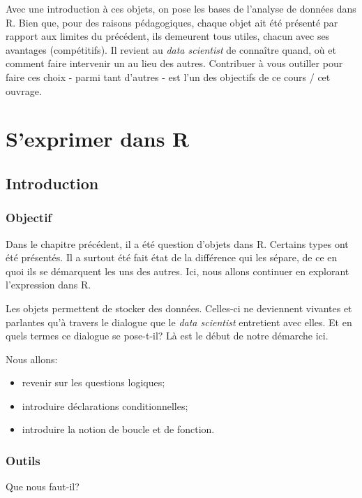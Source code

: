 \documentclass[]{book}
\begin{document}
Avec une introduction à ces objets, on pose les bases de l'analyse de
données dans R. Bien que, pour des raisons pédagogiques, chaque objet
ait été présenté par rapport aux limites du précédent, ils demeurent
tous utiles, chacun avec ses avantages (compétitifs). Il revient au
\emph{data scientist} de connaître quand, où et comment faire intervenir
un au lieu des autres. Contribuer à vous outiller pour faire ces choix -
parmi tant d'autres - est l'un des objectifs de ce cours / cet ouvrage.

\chapter{S'exprimer dans R}\label{sexprimer-dans-r}

\section{Introduction}\label{introduction-2}

\subsection{Objectif}\label{objectif}

Dans le chapitre précédent, il a été question d'objets dans R. Certains
types ont été présentés. Il a surtout été fait état de la différence qui
les sépare, de ce en quoi ils se démarquent les uns des autres. Ici,
nous allons continuer en explorant l'expression dans R.

Les objets permettent de stocker des données. Celles-ci ne deviennent
vivantes et parlantes qu'à travers le dialogue que le \emph{data
scientist} entretient avec elles. Et en quels termes ce dialogue se
pose-t-il? Là est le début de notre démarche ici.

Nous allons:

\begin{itemize}
\item
  revenir sur les questions logiques;
\item
  introduire déclarations conditionnelles;
\item
  introduire la notion de boucle et de fonction.
\end{itemize}

\subsection{Outils}\label{outils}

Que nous faut-il?
\end{document}
